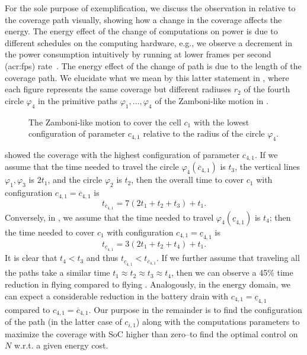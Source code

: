 For the sole purpose of exemplification, we discuss the observation in  relative to the coverage path visually, showing how a change in the coverage affects the energy. The energy effect of the change of computations on power is due to different schedules on the computing hardware, e.g., we observe a decrement in the power consumption intuitively by running at lower frames per second (\Gls{acr:fps}) rate~\citep{seewald2019coarse,seewald2020mechanical,zamanakos2020energy}. The energy effect of the change of path is due to the length of the coverage path. We elucidate what we mean by this latter statement in , where each figure represents the same coverage but different radiuses $r_2$ of the fourth circle $\varphi_4$ in the primitive paths $\varphi_1,\dots,\varphi_4$ of the Zamboni-like motion in . 
\begin{figure}[t!]
  \centering
  \selectfont
  
  \caption[Zamboni-like motion with the lowest parameter configuration]{The Zamboni-like motion to cover the cell $c_1$ with the lowest configuration of parameter $c_{4,1}$ relative to the radius of the circle $\varphi_4$.}
  \label{fig:zambo2}
\end{figure}
 showed the coverage with the highest configuration of parameter $c_{4,1}$. If we assume that the time needed to travel the circle $\varphi_4(\overline{c}_{4,1})$ is $t_3$, the vertical lines $\varphi_1,\varphi_3$ is $2t_1$, and the circle $\varphi_2$ is $t_2$, then the overall time to cover $c_1$ with configuration ${c}_{4,1}=\overline{c}_{4,1}$ is
\begin{equation}
  t_{\overline{c}_{4,1}}=7(2t_1+t_2+t_3)+t_1.  
\end{equation}
Conversely, in , we assume that the time needed to travel $\varphi_4(\underline{c}_{4,1})$ is $t_4$; then the time needed to cover $c_1$ with configuration ${c}_{4,1}=\underline{c}_{4,1}$ is 
\begin{equation}
t_{\underline{c}_{4,1}}=3(2t_1+t_2+t_4)+t_1. 
\end{equation}
It is clear that $t_4<t_3$ and thus $t_{\underline{c}_{4,1}}<t_{\overline{c}_{4,1}}$. If we further assume that traveling all the paths take a similar time $t_1\approx t_2\approx t_3\approx t_4$, then we can observe a 45\% time reduction in flying  compared to flying . Analogously, in the energy domain, we can expect a considerable reduction in the battery drain with ${c}_{4,1}=\underline{c}_{4,1}$ compared to ${c}_{4,1}=\overline{c}_{4,1}$. Our purpose in the remainder is to find the configuration of the path (in the latter case of $c_{i,1}$) along with the computations parameters to maximize the coverage with SoC higher than zero--to find the optimal control on $N$ w.r.t. a given energy cost.

